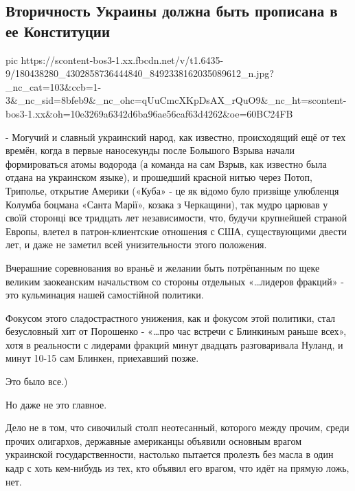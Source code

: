  
 
 
 
 
\subsection{Вторичность Украины должна быть прописана в ее Конституции}
\label{sec:07_05_2021.fb.arestovich_aleksej.1.narod_ukraina_usa}

\ifcmt
  pic https://scontent-bos3-1.xx.fbcdn.net/v/t1.6435-9/180438280_4302858736444840_8492338162035089612_n.jpg?_nc_cat=103&ccb=1-3&_nc_sid=8bfeb9&_nc_ohc=qUuCmcXKpDsAX_rQuO9&_nc_ht=scontent-bos3-1.xx&oh=10e3269a6342d6ba96ae56caf63d4262&oe=60BC24FB
\fi

- Могучий и славный украинский народ, как известно, происходящий ещё от тех
времён, когда в первые наносекунды после Большого Взрыва начали формироваться
атомы водорода (а команда на сам Взрыв, как известно была отдана на украинском
языке), и прошедший красной нитью через Потоп, Триполье, открытие Америки
(«Куба» - це як відомо було призвіще улюбленця Колумба боцмана «Санта Марії»,
козака з Черкащини), так мудро царював у своїй сторонці все тридцать лет
независимости, что, будучи крупнейшей страной Европы, влетел в
патрон-клиентские отношения с США, существующими двести лет, и даже не заметил
всей унизительности этого положения.

Вчерашние соревнования во враньё и желании быть потрёпанным по щеке великим
заокеанским начальством со стороны отдельных «…лидеров фракций» - это
кульминация нашей самостійной политики.

Фокусом этого сладострастного унижения, как и фокусом этой политики, стал
безусловный хит от Порошенко - «…про час встречи с Блинкиным раньше всех», хотя
в реальности с лидерами фракций минут двадцать разговаривала Нуланд, и минут
10-15 сам Блинкен, приехавший позже.

Это было все.)

Но даже не это главное.

Дело не в том, что сивочилый столп неотесанный, которого между прочим, среди
прочих олигархов, державные американцы объявили основным врагом украинской
государственности, настолько пытается пролезть без масла в один кадр с хоть
кем-нибудь из тех, кто объявил его врагом, что идёт на прямую ложь, нет.

